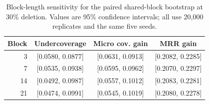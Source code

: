\documentclass[information,article,submit,oneauthor,pdftex]{Definitions/mdpi}
\begin{document}
\begin{table}[t]
\centering
\caption{Block-length sensitivity for the paired shared-block
bootstrap at 30\% deletion. Values are 95\% confidence intervals; all use
20,000 replicates and the same five seeds.}
\label{tab:block-sensitivity}
\scriptsize
\setlength{\tabcolsep}{2pt}
\begin{tabular}{@{}rccc@{}}
\toprule
Block & Undercoverage & Micro cov. gain & MRR gain\\
\midrule
3 & [0.0580, 0.0877] & [0.0631, 0.0913] & [0.2082, 0.2285]\\
7 & [0.0535, 0.0938] & [0.0595, 0.0962] & [0.2070, 0.2297]\\
14 & [0.0492, 0.0987] & [0.0557, 0.1012] & [0.2083, 0.2281]\\
21 & [0.0474, 0.0991] & [0.0545, 0.1019] & [0.2080, 0.2278]\\
\bottomrule
\end{tabular}
\end{table}

\FloatBarrier
{}

\end{document}
